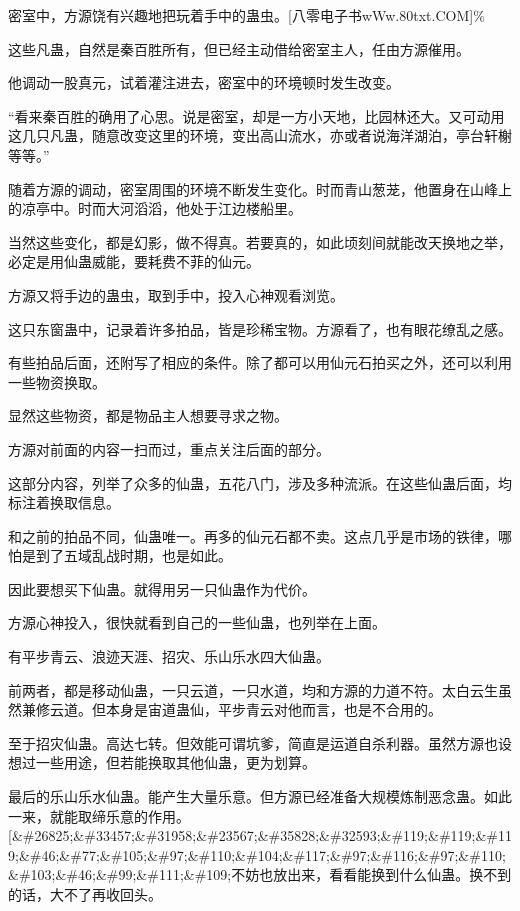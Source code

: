 
\begin{this_body}

密室中，方源饶有兴趣地把玩着手中的蛊虫。[八零电子书wWw.80txt.COM]\%

这些凡蛊，自然是秦百胜所有，但已经主动借给密室主人，任由方源催用。

他调动一股真元，试着灌注进去，密室中的环境顿时发生改变。

“看来秦百胜的确用了心思。说是密室，却是一方小天地，比园林还大。又可动用这几只凡蛊，随意改变这里的环境，变出高山流水，亦或者说海洋湖泊，亭台轩榭等等。”

随着方源的调动，密室周围的环境不断发生变化。时而青山葱茏，他置身在山峰上的凉亭中。时而大河滔滔，他处于江边楼船里。

当然这些变化，都是幻影，做不得真。若要真的，如此顷刻间就能改天换地之举，必定是用仙蛊威能，要耗费不菲的仙元。

方源又将手边的蛊虫，取到手中，投入心神观看浏览。

这只东窗蛊中，记录着许多拍品，皆是珍稀宝物。方源看了，也有眼花缭乱之感。

有些拍品后面，还附写了相应的条件。除了都可以用仙元石拍买之外，还可以利用一些物资换取。

显然这些物资，都是物品主人想要寻求之物。

方源对前面的内容一扫而过，重点关注后面的部分。

这部分内容，列举了众多的仙蛊，五花八门，涉及多种流派。在这些仙蛊后面，均标注着换取信息。

和之前的拍品不同，仙蛊唯一。再多的仙元石都不卖。这点几乎是市场的铁律，哪怕是到了五域乱战时期，也是如此。

因此要想买下仙蛊。就得用另一只仙蛊作为代价。

方源心神投入，很快就看到自己的一些仙蛊，也列举在上面。

有平步青云、浪迹天涯、招灾、乐山乐水四大仙蛊。

前两者，都是移动仙蛊，一只云道，一只水道，均和方源的力道不符。太白云生虽然兼修云道。但本身是宙道蛊仙，平步青云对他而言，也是不合用的。

至于招灾仙蛊。高达七转。但效能可谓坑爹，简直是运道自杀利器。虽然方源也设想过一些用途，但若能换取其他仙蛊，更为划算。

最后的乐山乐水仙蛊。能产生大量乐意。但方源已经准备大规模炼制恶念蛊。如此一来，就能取缔乐意的作用。[\&\#26825;\&\#33457;\&\#31958;\&\#23567;\&\#35828;\&\#32593;\&\#119;\&\#119;\&\#119;\&\#46;\&\#77;\&\#105;\&\#97;\&\#110;\&\#104;\&\#117;\&\#97;\&\#116;\&\#97;\&\#110;\&\#103;\&\#46;\&\#99;\&\#111;\&\#109;不妨也放出来，看看能换到什么仙蛊。换不到的话，大不了再收回头。


\end{this_body}
